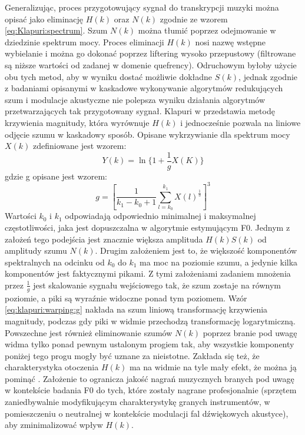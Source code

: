 \documentclass[12pt,a4paper,twoside]{mwart}
\begin{document}
Generalizując, proces przygotowujący sygnał do transkrypcji muzyki można opisać jako eliminację $H(k)$ oraz $N(k)$ zgodnie ze wzorem \ref{eq:Klapuri:spectrum}. Szum $N(k)$ można tłumić poprzez odejmowanie w dziedzinie spektrum mocy. Proces eliminacji $H(k)$ nosi nazwę wstępne wybielanie i można go dokonać poprzez liftering wysoko przepustowy (filtrowane są niższe wartości od zadanej w domenie quefrency). Odruchowym byłoby użycie obu tych metod, aby w wyniku dostać możliwie dokładne $S(k)$, jednak zgodnie z badaniami opisanymi w 
\cite[84-86]{Transcription:Hermansky:RecognitionInNoise} 
kaskadowe wykonywanie algorytmów redukujących szum i modulacje akustyczne nie polepsza wyniku działania algorytmów przetwarzających tak przygotowany sygnał. Klapuri w 
\cite[806]{Transcription:Klapuri:MultipleFundamentalFrequencyEstimation} 
przedstawia metodę krzywienia magnitudy, która wyrównuje $H(k)$ i jednocześnie pozwala na liniowe odjęcie szumu w kaskadowy sposób. Opisane wykrzywianie dla spektrum mocy $X(k)$ zdefiniowane jest wzorem:
\begin{equation}\label{eq:klapuri:warping}
  Y(k) = \ln\{ 1 + \frac{1}{g}X(K)\}
\end{equation}
gdzie g opisane jest wzorem:
\begin{equation}\label{eq:klapuri:warping:g}
  g = [ \frac{1}{k_1 - k_0 + 1} \sum_{l=k_0}^{k_1}X(l)^{\frac{1}{3}}]^3
\end{equation}
Wartości $k_0$ i $k_1$ odpowiadają odpowiednio minimalnej i maksymalnej częstotliwości, jaka jest dopuszczalna w algorytmie estymującym F0. Jednym z założeń tego podejścia jest znacznie większa amplituda $H(k)S(k)$ od amplitudy szumu $N(k)$. Drugim założeniem jest to, że większość komponentów spektralnych na odcinku od $k_0$ do $k_1$  ma moc na poziomie szumu, a jedynie kilka komponentów jest faktycznymi pikami. Z tymi założeniami zadaniem mnożenia przez $\frac{1}{g}$ jest skalowanie sygnału wejściowego tak, że szum zostaje na równym poziomie, a piki są wyraźnie widoczne ponad tym poziomem. Wzór \ref{eq:klapuri:warping:g} nakłada na szum liniową transformację krzywienia magnitudy, podczas gdy piki w widmie przechodzą transformację logarytmiczną. Powszechne jest również eliminowanie szumów $N(k)$ poprzez branie pod uwagę widma tylko ponad pewnym ustalonym progiem tak, aby wszystkie komponenty poniżej tego progu mogły być uznane za nieistotne. Zakłada się też, że charakterystyka otoczenia $H(k)$ ma na widmie na tyle mały efekt, że można ją pominąć \cite{Transcription:Pertus:Inharmonicity}. Założenie to ogranicza jakość nagrań muzycznych branych pod uwagę w kontekście badania F0 do tych, które zostały nagrane profesjonalnie (sprzętem zaniedbywalnie modyfikującym charakterystykę granych instrumentów, w pomieszczeniu o neutralnej w kontekście modulacji fal dźwiękowych akustyce), aby zminimalizować wpływ $H(k)$.
\end{document}
